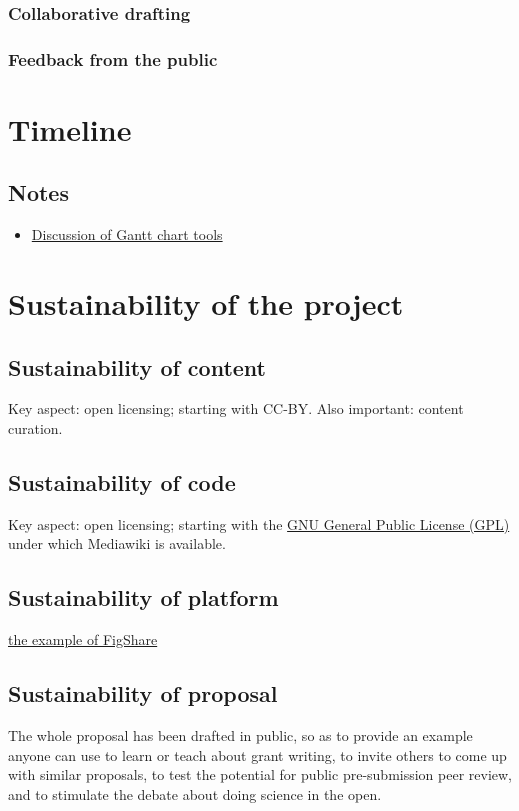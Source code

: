 \documentclass[final,authoryear,3p]{elsarticle-open-drafting}
\begin{document}
\subsubsection{Collaborative drafting}
\subsubsection{Feedback from the public}

\section{Timeline}

\subsection{Notes}
\begin{itemize}
	\item \href{http://ff.im/D6rQ0}{Discussion of Gantt chart tools}
\end{itemize}

\section{Sustainability of the project}
\subsection{Sustainability of content}
Key aspect: open licensing; starting with CC-BY.
Also important: content curation.

\subsection{Sustainability of code}
Key aspect: open licensing; starting with the \href{http://www.gnu.org/licenses/gpl.html}{GNU General Public License (GPL)} under which Mediawiki is available.

\subsection{Sustainability of platform}
\href{http://www.pawelszczesny.org/2011/03/02/systems-institute-is-officially-supporting-figshare-backstage-story/}{the example of FigShare}

\subsection{Sustainability of proposal}
The whole proposal has been drafted in public, so as to provide an example anyone can use 
to learn or teach about grant writing, to invite others to come up with similar proposals, to test the potential for public pre-submission peer review, and to stimulate the debate about doing science in the open.
\end{document}
